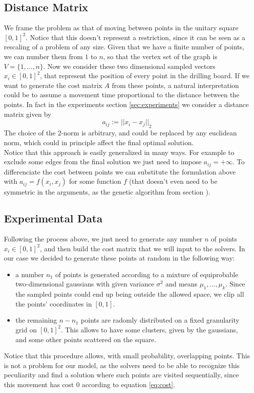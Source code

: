\documentclass{article}
\begin{document}
\subsection{Distance Matrix}
We frame the problem as that of moving between points in the unitary square $[0, 1]^2$. Notice that this doesn't represent a restriction, since it can be seen as a rescaling of a problem of any size. Given that we have a finite number of points, we can number them from $1$ to $n$, so that the vertex set of the graph is $V = \{ 1, \ldots, n  \}$. Now we consider these two dimensional sampled vectors $x_i \in [0, 1]^2 $, that represent the position of every point in the drilling board. If we want to generate the cost matrix $A$ from these points, a natural interpretation could be to assume a movement time proportional to the distance between the points. In fact in the experiments section \ref{sec:experiments} we consider a distance matrix given by
\begin{equation}\label{eq:cost}
a_{ij} := {|| x_i - x_j ||}_2
\end{equation} 
The choice of the 2-norm is arbitrary, and could be replaced by any euclidean norm, which could in principle affect the final optimal solution. \\
Notice that this approach is easily generalized in many ways. For example to exclude some edges from the final solution we just need to impose $a_{ij} = +\infty$. To differenciate the cost between points we can substitute the formulation above with $a_{ij} = f(x_i, x_j)$ for some function $f$ (that doesn't even need to be symmetric in the arguments, as the genetic algorithm from section ).  

\subsection{Experimental Data}\label{sec:experimental_data}
Following the process above, we just need to generate any number $n$ of points $x_i \in [0, 1]^2 $, and then build the cost matrix that we will input to the solvers. In our case we decided to generate these points at random in the following way:
\begin{itemize}
\item a number $n_1$ of points is generated according to a mixture of equiprobable two-dimensional gaussians with given variance $\sigma^2$ and means $\mu_1, \ldots, \mu_k$. Since the sampled points could end up being outside the allowed space, we clip all the points' coordinates in $[0, 1]$. 
\item the remaining $n-n_1$ points are radomly distributed on a fixed granularity grid on  $[0, 1]^2$. This allows to have some clusters, given by the gaussians, and some other points scattered on the square. 
\end{itemize}
Notice that this procedure allows, with small probability, overlapping points. This is not a problem for our model, as the solvers need to be able to recognize this peculiarity and find a solution where such points are visited sequentially, since this movement has cost 0 according to equation \eqref{eq:cost}.
\end{document}
